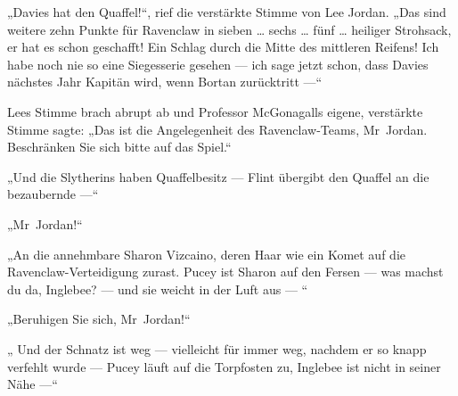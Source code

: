 „Davies hat den Quaffel!“, rief die verstärkte Stimme von Lee Jordan.
„Das sind weitere zehn Punkte für Ravenclaw in sieben … sechs … fünf … heiliger Strohsack, er hat es schon geschafft! Ein Schlag durch die Mitte des mittleren Reifens! Ich habe noch nie so eine Siegesserie gesehen — ich sage jetzt schon, dass Davies nächstes Jahr Kapitän wird, wenn Bortan zurücktritt —“

Lees Stimme brach abrupt ab und Professor McGonagalls eigene, verstärkte Stimme sagte:
„Das ist die Angelegenheit des Ravenclaw-Teams, Mr~Jordan. Beschränken Sie sich bitte auf das Spiel.“

„Und die Slytherins haben Quaffelbesitz — Flint übergibt den Quaffel an die bezaubernde —“

„Mr~Jordan!“

„An die annehmbare Sharon Vizcaino, deren Haar wie ein Komet auf die Ravenclaw-Verteidigung zurast. Pucey ist Sharon auf den Fersen — was machst du da, Inglebee? — und sie weicht in der Luft aus — “

„Beruhigen Sie sich, Mr~Jordan!“

„ Und der Schnatz ist weg — vielleicht für immer weg, nachdem er so knapp verfehlt wurde — Pucey läuft auf die Torpfosten zu, Inglebee ist nicht in seiner Nähe —“

